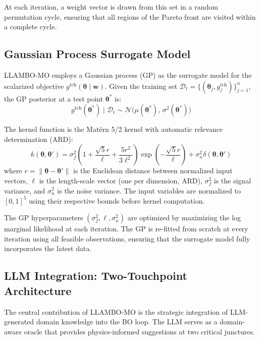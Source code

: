 \documentclass[lettersize,journal]{IEEEtran}
\begin{document}
At each iteration, a weight vector is drawn from this set in a random permutation cycle, ensuring that all regions of the Pareto front are visited within a complete cycle.

\subsection{Gaussian Process Surrogate Model}

LLAMBO-MO employs a Gaussian process (GP) as the surrogate model for the scalarized objective $g^{\text{tch}}(\boldsymbol{\theta} \mid \boldsymbol{w})$. Given the training set $\mathcal{D}_t = \{(\boldsymbol{\theta}_j, g_j^{\text{tch}})\}_{j=1}^{n}$, the GP posterior at a test point $\boldsymbol{\theta}^*$ is:
\begin{equation}
\label{eq:gp_posterior}
g^{\text{tch}}(\boldsymbol{\theta}^*) \mid \mathcal{D}_t \sim \mathcal{N}\bigl(\mu(\boldsymbol{\theta}^*), \, \sigma^2(\boldsymbol{\theta}^*)\bigr)
\end{equation}

The kernel function is the Mat\'{e}rn 5/2 kernel with automatic relevance determination (ARD):
\begin{equation}
\label{eq:kernel}
k(\boldsymbol{\theta}, \boldsymbol{\theta}') = \sigma_f^2 \!\left(1 + \frac{\sqrt{5}r}{\ell} + \frac{5r^2}{3\ell^2}\right) \exp\!\left(-\frac{\sqrt{5}r}{\ell}\right) + \sigma_n^2 \delta(\boldsymbol{\theta}, \boldsymbol{\theta}')
\end{equation}
where $r = \|\boldsymbol{\theta} - \boldsymbol{\theta}'\|$ is the Euclidean distance between normalized input vectors, $\ell$ is the length-scale vector (one per dimension, ARD), $\sigma_f^2$ is the signal variance, and $\sigma_n^2$ is the noise variance. The input variables are normalized to $[0, 1]^5$ using their respective bounds before kernel computation.

The GP hyperparameters $(\sigma_f^2, \boldsymbol{\ell}, \sigma_n^2)$ are optimized by maximizing the log marginal likelihood at each iteration. The GP is re-fitted from scratch at every iteration using all feasible observations, ensuring that the surrogate model fully incorporates the latest data.

\subsection{LLM Integration: Two-Touchpoint Architecture}

The central contribution of LLAMBO-MO is the strategic integration of LLM-generated domain knowledge into the BO loop. The LLM serves as a domain-aware oracle that provides physics-informed suggestions at two critical junctures.
\end{document}
